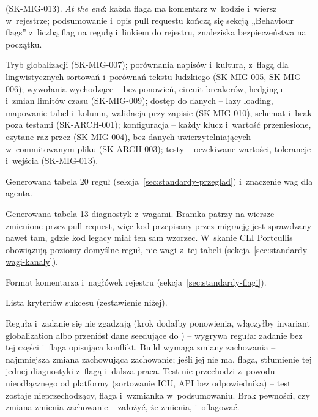 \begin{description}
        (SK-MIG-013). \emph{At the end}: każda flaga ma komentarz w~kodzie i~wiersz w~rejestrze;
        podsumowanie i~opis pull requestu kończą się sekcją „Behaviour flags” z~liczbą flag
        na regułę i~linkiem do rejestru, znaleziska bezpieczeństwa na początku.
  \item[Never change silently.] Tryb globalizacji (SK-MIG-007); porównania napisów i~kultura,
        z~flagą dla lingwistycznych sortowań i~porównań tekstu ludzkiego (SK-MIG-005,
        SK-MIG-006); wywołania wychodzące -- bez ponowień, circuit breakerów, hedgingu i~zmian
        limitów czasu (SK-MIG-009); dostęp do danych -- lazy loading, mapowanie tabel
        i~kolumn, walidacja przy zapisie (SK-MIG-010), schemat i~brak 
        poza testami (SK-ARCH-001); konfiguracja -- każdy klucz i~wartość przeniesione,
        czytane raz przez  (SK-MIG-004), bez danych uwierzytelniających
        w~commitowanym pliku (SK-ARCH-003); testy -- oczekiwane wartości, tolerancje i~wejścia
        (SK-MIG-013).
  \item[Rules.] Generowana tabela 20 reguł (sekcja~\ref{sec:standardy-przeglad}) i~znaczenie
        wag dla agenta.
  \item[What the gate checks.] Generowana tabela 13 diagnostyk z~wagami. Bramka patrzy na
        wiersze zmienione przez pull request, więc kod przepisany przez migrację jest
        sprawdzany nawet tam, gdzie kod legacy miał ten sam wzorzec. W~skanie CLI Portcullis
        obowiązują poziomy domyślne reguł, nie wagi z~tej tabeli
        (sekcja~\ref{sec:standardy-wagi-kanaly}).
  \item[Flag format.] Format komentarza i~nagłówek rejestru (sekcja~\ref{sec:standardy-flagi}).
  \item[Success criteria.] Lista kryteriów sukcesu (zestawienie niżej).
  \item[When something goes wrong.] Reguła i~zadanie się nie zgadzają (krok dodałby
        ponowienia, włączyłby invariant globalization albo przeniósł dane seedujące do
        ) -- wygrywa reguła: zadanie bez tej części i~flaga opisująca
        konflikt. Build wymaga zmiany zachowania -- najmniejsza zmiana zachowująca zachowanie;
        jeśli jej nie ma, flaga, stłumienie tej jednej diagnostyki z~flagą i~dalsza praca.
        Test nie przechodzi z~powodu nieodłącznego od platformy (sortowanie ICU, API bez
        odpowiednika) -- test zostaje nieprzechodzący, flaga i~wzmianka w~podsumowaniu. Brak
        pewności, czy zmiana zmienia zachowanie -- założyć, że zmienia, i~oflagować.
\end{description}

